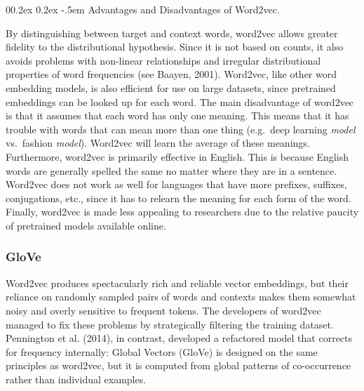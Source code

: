 \documentclass[
  man,
  floatsintext,
  longtable,
  nolmodern,
  notxfonts,
  notimes,
  colorlinks=true,linkcolor=blue,citecolor=blue,urlcolor=blue]{apa7}
\makeatletter
\renewcommand{\paragraph}{\@startsection{paragraph}{4}{\parindent}%
	{0\baselineskip \@plus 0.2ex \@minus 0.2ex}%
	{-.5em}%
	{\normalfont\normalsize\bfseries\typesectitle}}
\makeatother
\begin{document}
\paragraph{Advantages and Disadvantages of
Word2vec.}\label{advantages-and-disadvantages-of-word2vec}

By distinguishing between target and context words, word2vec allows
greater fidelity to the distributional hypothesis. Since it is not based
on counts, it also avoids problems with non-linear relationships and
irregular distributional properties of word frequencies (see Baayen,
2001). Word2vec, like other word embedding models, is also efficient for
use on large datasets, since pretrained embeddings can be looked up for
each word. The main disadvantage of word2vec is that it assumes that
each word has only one meaning. This means that it has trouble with
words that can mean more than one thing (e.g.~deep learning \emph{model}
vs.~fashion \emph{model}). Word2vec will learn the average of these
meanings. Furthermore, word2vec is primarily effective in English. This
is because English words are generally spelled the same no matter where
they are in a sentence. Word2vec does not work as well for languages
that have more prefixes, suffixes, conjugations, etc., since it has to
relearn the meaning for each form of the word. Finally, word2vec is made
less appealing to researchers due to the relative paucity of pretrained
models available online.

\subsubsection{GloVe}\label{glove}

Word2vec produces spectacularly rich and reliable vector embeddings, but
their reliance on randomly sampled pairs of words and contexts makes
them somewhat noisy and overly sensitive to frequent tokens. The
developers of word2vec managed to fix these problems by strategically
filtering the training dataset. Pennington et al. (2014), in contrast,
developed a refactored model that corrects for frequency internally:
Global Vectors (GloVe) is designed on the same principles as word2vec,
but it is computed from global patterns of co-occurrence rather than
individual examples.
\end{document}
